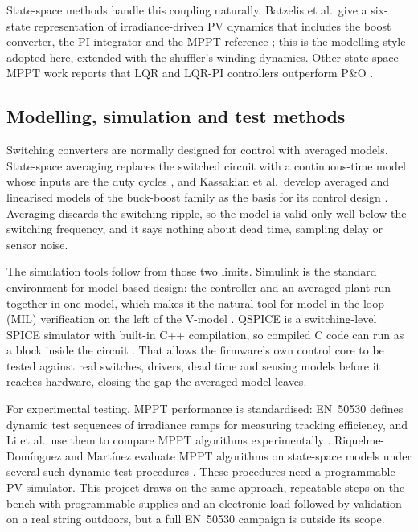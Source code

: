State-space methods handle this coupling naturally. Batzelis et al.\ give a six-state representation of irradiance-driven PV dynamics that includes the boost converter, the PI integrator and the MPPT reference \cite{batzelis_state-space_2018}; this is the modelling style adopted here, extended with the shuffler's winding dynamics. Other state-space MPPT work reports that LQR and LQR-PI controllers outperform P\&O \cite{lin_state-space_2021,khan_state-space_2024,assabaa_enhancing_2025}.

\subsection{Modelling, simulation and test methods}
\label{sec:lit_methods}
Switching converters are normally designed for control with averaged models. State-space averaging replaces the switched circuit with a continuous-time model whose inputs are the duty cycles \cite{middlebrook_general_1976}, and Kassakian et al.\ develop averaged and linearised models of the buck-boost family as the basis for its control design \cite{kassakian_principles_2024}. Averaging discards the switching ripple, so the model is valid only well below the switching frequency, and it says nothing about dead time, sampling delay or sensor noise.

The simulation tools follow from those two limits. Simulink is the standard environment for model-based design: the controller and an averaged plant run together in one model, which makes it the natural tool for model-in-the-loop (MIL) verification on the left of the V-model \cite{mathworks_simulink_2026,seal_system_2018}. QSPICE is a switching-level SPICE simulator with built-in C++ compilation, so compiled C code can run as a block inside the circuit \cite{qorvo_qspice_2023}. That allows the firmware's own control core to be tested against real switches, drivers, dead time and sensing models before it reaches hardware, closing the gap the averaged model leaves.

For experimental testing, MPPT performance is standardised: EN~50530 defines dynamic test sequences of irradiance ramps for measuring tracking efficiency, and Li et al.\ use them to compare MPPT algorithms experimentally \cite{li_comparative_2021}. Riquelme-Dom\'inguez and Mart\'inez evaluate MPPT algorithms on state-space models under several such dynamic test procedures \cite{riquelme-dominguez_systematic_2022}. These procedures need a programmable PV simulator. This project draws on the same approach, repeatable steps on the bench with programmable supplies and an electronic load followed by validation on a real string outdoors, but a full EN~50530 campaign is outside its scope.

